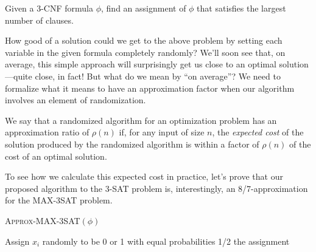 \documentclass{article}
\newenvironment{definition}[2][Definition]{\begin{trivlist}
\item[\hskip \labelsep {\bfseries #1}\hskip \labelsep {\bfseries #2.}]}{\end{trivlist}}
\newenvironment{envsection}[1]{\begin{trivlist}
\item[\hskip \labelsep {\bfseries #1}]}{\end{trivlist}}
\begin{document}
\begin{envsection}{Optimization Problem (MAX-$3$SAT)}
    Given a 3-CNF formula $\phi$, find an assignment of $\phi$ that satisfies the largest number of clauses.
\end{envsection}

\noindent How good of a solution could we get to the above problem by setting each variable in the given formula completely randomly? We'll soon see that, on average, this simple approach will surprisingly get us close to an optimal solution---quite close, in fact! But what do we mean by ``on average''? We need to formalize what it means to have an approximation factor when our algorithm involves an element of randomization.

\begin{definition}{(Randomized Approximation Algorithm)}{}
    We say that a randomized algorithm for an optimization problem has an approximation ratio of $\rho(n)$ if, for any input of size $n$, the \textit{expected cost} of the solution produced by the randomized algorithm is within a factor of $\rho(n)$ of the cost of an optimal solution.
\end{definition}

\noindent To see how we calculate this expected cost in practice, let's prove that our proposed algorithm to the 3-SAT problem is, interestingly, an 8/7-approximation for the MAX-3SAT problem.

\begin{algorithm}
    \renewcommand{\thealgorithm}{}
    \caption{\textsc{Approx-MAX-3SAT}$(\phi)$}
    \begin{algorithmic}
            \State Assign $x_i$ randomly to be 0 or 1 with equal probabilities 1/2
        \EndFor
        \State \Return the assignment
    \end{algorithmic}
\end{algorithm}
\end{document}

